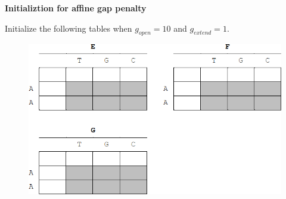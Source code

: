 \question \textbf{Initializtion for affine gap penalty}
  
Initialize the following tables when $g_{open} = 10$ and $g_{extend} = 1$.

\vspace{0.1 in}

\begin{figure}[h]
  \centering
      \includegraphics[width=0.7 \textwidth]{fig03/affine_dp_initialize.png}
\end{figure}

  \vspace{0.1 in}